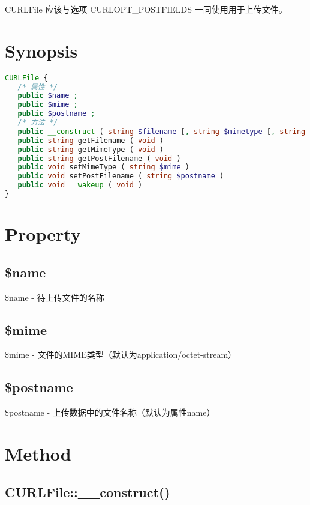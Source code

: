 CURLFile 应该与选项 CURLOPT\_POSTFIELDS 一同使用用于上传文件。


\section{Synopsis}





\begin{lstlisting}[language=PHP]
CURLFile {
   /* 属性 */
   public $name ;
   public $mime ;
   public $postname ;
   /* 方法 */
   public __construct ( string $filename [, string $mimetype [, string $postname ]] )
   public string getFilename ( void )
   public string getMimeType ( void )
   public string getPostFilename ( void )
   public void setMimeType ( string $mime )
   public void setPostFilename ( string $postname )
   public void __wakeup ( void )
}
\end{lstlisting}


\section{Property}



\subsection{\$name}

\$name - 待上传文件的名称



\subsection{\$mime}

\$mime - 文件的MIME类型（默认为application/octet-stream）


\subsection{\$postname}

\$postname - 上传数据中的文件名称（默认为属性name）

\section{Method}


\subsection{CURLFile::\_\_construct()}

